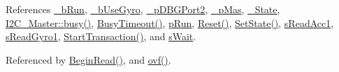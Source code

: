 References \hyperlink{_i_m_u_8h_source_l00107}{\_\-bRun}, \hyperlink{_i_m_u_8h_source_l00100}{\_\-bUseGyro}, \hyperlink{_i_m_u_8h_source_l00113}{\_\-pDBGPort2}, \hyperlink{_i_m_u_8h_source_l00089}{\_\-pMas}, \hyperlink{_i_m_u_8h_source_l00085}{\_\-State}, \hyperlink{class_i2_c___master_aa8b792984d9e4f42da45f38dbb6e8941}{I2C\_\-Master::busy()}, \hyperlink{_i_m_u_8h_source_l00195}{BusyTimeout()}, \hyperlink{_i_m_u_8h_source_l00056}{pRun}, \hyperlink{_i_m_u_8cpp_source_l00153}{Reset()}, \hyperlink{_i_m_u_8h_source_l00178}{SetState()}, \hyperlink{_i_m_u_8h_source_l00048}{sReadAcc1}, \hyperlink{_i_m_u_8h_source_l00047}{sReadGyro1}, \hyperlink{_i_m_u_8cpp_source_l00323}{StartTransaction()}, and \hyperlink{_i_m_u_8h_source_l00046}{sWait}.



Referenced by \hyperlink{_i_m_u_8cpp_source_l00108}{BeginRead()}, and \hyperlink{_i_m_u_8cpp_source_l00746}{ovf()}.


